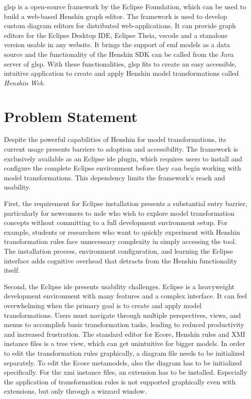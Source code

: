 \ac{glsp} is a open-source framework by the Eclipse Foundation, which can be used to build a web-based Henshin graph editor. The framework is used to develop custom diagram editors for distributed web-applications. \cite{glsp-repo} It can provide graph editors for the Eclipse Desktop IDE, Eclipse Theia, \ac{vscode} and a stanalone version usable in any website. It brings the support of \ac{emf} models as a data source and the functionality of the Henshin SDK can be called from the Java server of \ac{glsp}. \cite{glsp-doc} With these functionalities, \ac{glsp} fits to create an easy accessible, intuitive application to create and apply Henshin model transformations called \textit{Henshin Web}.

\section{Problem Statement}
\label{subsec:problem-statement}

Despite the powerful capabilities of Henshin for model transformations, its current usage presents barriers to adoption and accessibility. The framework is exclusively available as an Eclipse \ac{ide} plugin, which requires users to install and configure the complete Eclipse environment before they can begin working with model transformations. This dependency limits the framework's reach and usability.

First, the requirement for Eclipse installation presents a substantial entry barrier, particularly for newcomers to \ac{mde} who wish to explore model transformation concepts without committing to a full development environment setup. For example, students or researchers who want to quickly experiment with Henshin transformation rules face unnecessary complexity in simply accessing the tool. The installation process, environment configuration, and learning the Eclipse interface adds cognitive overhead that detracts from the Henshin functionality itself.

Second, the Eclipse \ac{ide} presents usability challenges. Eclipse is a heavyweight development environment with many features and a complex interface. It can feel overwhelming when the primary goal is to create and apply model transformations. Users must navigate through multiple perspectives, views, and menus to accomplish basic transformation tasks, leading to reduced productivity and increased frustration.
The standard editor for Ecore, Henshin rules and \ac{XMI} instance files is a tree view, which can get unintuitive for bigger models. In order to edit the transformation rules graphically, a diagram file needs to be initialized separately. To edit the Ecore metamodels, also the diagram has to be initialized specifically. For the \ac{xmi} instance files, an extension has to be installed. Especially the application of transformation rules is not supported graphically even with extensions, but only through a wizzard window.  

